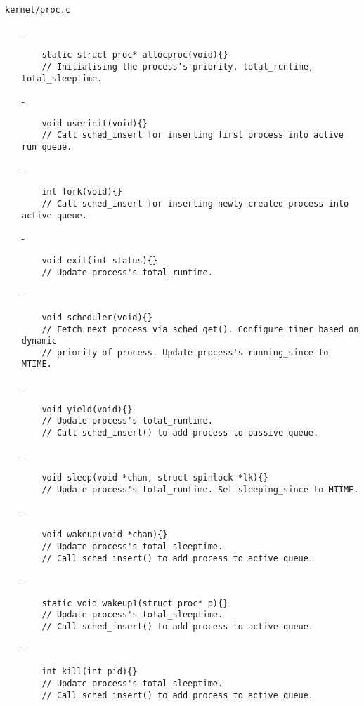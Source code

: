 \documentclass[11pt]{article}
\begin{document}
\texttt{kernel/proc.c}
\begin{enumerate}
    \item[-]\begin{verbatim}
    static struct proc* allocproc(void){}
    // Initialising the process’s priority, total_runtime, total_sleeptime.
    \end{verbatim}
    \item[-]\begin{verbatim}
    void userinit(void){} 
    // Call sched_insert for inserting first process into active run queue.
    \end{verbatim}
    \item[-]\begin{verbatim}
    int fork(void){}
    // Call sched_insert for inserting newly created process into active queue.
    \end{verbatim}
    \item[-]\begin{verbatim}
    void exit(int status){}
    // Update process's total_runtime.
    \end{verbatim}
    \item[-]\begin{verbatim}
    void scheduler(void){}
    // Fetch next process via sched_get(). Configure timer based on dynamic 
    // priority of process. Update process's running_since to MTIME.
    \end{verbatim}
    \item[-]\begin{verbatim}
    void yield(void){}
    // Update process's total_runtime. 
    // Call sched_insert() to add process to passive queue.
    \end{verbatim}
    \item[-]\begin{verbatim}
    void sleep(void *chan, struct spinlock *lk){}
    // Update process's total_runtime. Set sleeping_since to MTIME.
    \end{verbatim}
    \item[-]\begin{verbatim}
    void wakeup(void *chan){}
    // Update process's total_sleeptime. 
    // Call sched_insert() to add process to active queue.
    \end{verbatim}
    \item[-]\begin{verbatim}
    static void wakeup1(struct proc* p){}
    // Update process's total_sleeptime. 
    // Call sched_insert() to add process to active queue.
    \end{verbatim}
    \item[-]\begin{verbatim}
    int kill(int pid){}
    // Update process's total_sleeptime. 
    // Call sched_insert() to add process to active queue.
    \end{verbatim}
\end{enumerate}
\end{document}

